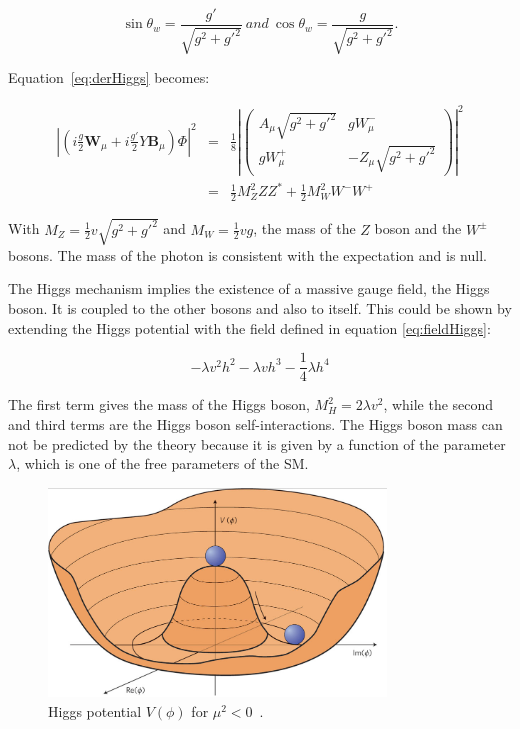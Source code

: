       \begin{equation}
        \sin{\theta_{w}} = \frac{g'}{\sqrt{g^2+g'^2}} \ and \ \cos{\theta_{w}} = \frac{g}{\sqrt{g^2+g'^2}}.
      \end{equation} 

      Equation~\ref{eq:derHiggs} becomes:

      \begin{equation}
        \begin{array}{rcl}
       \left|\left(i\frac{g}{2}\textbf{W}_{\mu} +i\frac{g'}{2}Y\textbf{B}_{\mu}\right) \Phi \right|^2 & = & \frac{1}{8} \left| 
          \begin{pmatrix}
            A_{\mu}\sqrt{g^2 + g'^2} & gW^-_{\mu} \\
            gW^+_{\mu} & -Z_{\mu}\sqrt{g^2 + g'^2}
          \end{pmatrix}
       \right|^2 \\
        & = & \frac{1}{2}M^2_Z ZZ^* + \frac{1}{2}M^2_W W^-W^+
        \end{array}
      \end{equation}

      With $M_Z = \frac{1}{2}v\sqrt{g^2 + g'^2}$ and $M_W = \frac{1}{2} vg$, the mass of the $Z$ boson and the $W^{\pm}$ bosons. 
      The mass of the photon is consistent with the expectation and is null. 

      The Higgs mechanism implies the existence of a massive gauge field, the Higgs boson.
      It is coupled to the other bosons and also to itself.
      This could be shown by extending the Higgs potential with the field defined in equation \ref{eq:fieldHiggs}:

      \begin{equation}
        -\lambda v^2h^2 - \lambda v h^3 - \frac{1}{4}\lambda h^4
      \end{equation}

      The first term gives the mass of the Higgs boson, $M^2_H = 2\lambda v^2$, while the second and third terms are the Higgs boson self-interactions.
      The Higgs boson mass can not be predicted by the theory because it is given by a function of the parameter $\lambda$, which is one of the free parameters of the \gls{SM}.
      
      \begin{figure}[!h]
        \centering
        \includegraphics[width = 0.8\textwidth]{Pictures/SM/higgsPotential.png}
        \caption{Higgs potential $V(\phi)$ for $\mu^2 < 0$~\cite{deBoer:2013pud}.}
        \label{fig:scalarPotential}
      \end{figure}

